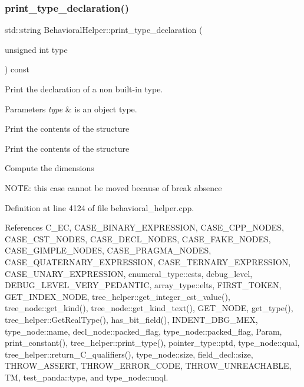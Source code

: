 \subsubsection{\texorpdfstring{print\+\_\+type\+\_\+declaration()}{print\_type\_declaration()}}
{\footnotesize\ttfamily std\+::string Behavioral\+Helper\+::print\+\_\+type\+\_\+declaration (\begin{DoxyParamCaption}\item[{unsigned int}]{type }\end{DoxyParamCaption}) const\hspace{0.3cm}{\ttfamily [virtual]}}



Print the declaration of a non built-\/in type. 


\begin{DoxyParams}{Parameters}
{\em type} & is an object type. \\
\hline
\end{DoxyParams}
Print the contents of the structure

Print the contents of the structure

Compute the dimensions

N\+O\+TE\+: this case cannot be moved because of break absence 

Definition at line 4124 of file behavioral\+\_\+helper.\+cpp.



References C\+\_\+\+EC, C\+A\+S\+E\+\_\+\+B\+I\+N\+A\+R\+Y\+\_\+\+E\+X\+P\+R\+E\+S\+S\+I\+ON, C\+A\+S\+E\+\_\+\+C\+P\+P\+\_\+\+N\+O\+D\+ES, C\+A\+S\+E\+\_\+\+C\+S\+T\+\_\+\+N\+O\+D\+ES, C\+A\+S\+E\+\_\+\+D\+E\+C\+L\+\_\+\+N\+O\+D\+ES, C\+A\+S\+E\+\_\+\+F\+A\+K\+E\+\_\+\+N\+O\+D\+ES, C\+A\+S\+E\+\_\+\+G\+I\+M\+P\+L\+E\+\_\+\+N\+O\+D\+ES, C\+A\+S\+E\+\_\+\+P\+R\+A\+G\+M\+A\+\_\+\+N\+O\+D\+ES, C\+A\+S\+E\+\_\+\+Q\+U\+A\+T\+E\+R\+N\+A\+R\+Y\+\_\+\+E\+X\+P\+R\+E\+S\+S\+I\+ON, C\+A\+S\+E\+\_\+\+T\+E\+R\+N\+A\+R\+Y\+\_\+\+E\+X\+P\+R\+E\+S\+S\+I\+ON, C\+A\+S\+E\+\_\+\+U\+N\+A\+R\+Y\+\_\+\+E\+X\+P\+R\+E\+S\+S\+I\+ON, enumeral\+\_\+type\+::csts, debug\+\_\+level, D\+E\+B\+U\+G\+\_\+\+L\+E\+V\+E\+L\+\_\+\+V\+E\+R\+Y\+\_\+\+P\+E\+D\+A\+N\+T\+IC, array\+\_\+type\+::elts, F\+I\+R\+S\+T\+\_\+\+T\+O\+K\+EN, G\+E\+T\+\_\+\+I\+N\+D\+E\+X\+\_\+\+N\+O\+DE, tree\+\_\+helper\+::get\+\_\+integer\+\_\+cst\+\_\+value(), tree\+\_\+node\+::get\+\_\+kind(), tree\+\_\+node\+::get\+\_\+kind\+\_\+text(), G\+E\+T\+\_\+\+N\+O\+DE, get\+\_\+type(), tree\+\_\+helper\+::\+Get\+Real\+Type(), has\+\_\+bit\+\_\+field(), I\+N\+D\+E\+N\+T\+\_\+\+D\+B\+G\+\_\+\+M\+EX, type\+\_\+node\+::name, decl\+\_\+node\+::packed\+\_\+flag, type\+\_\+node\+::packed\+\_\+flag, Param, print\+\_\+constant(), tree\+\_\+helper\+::print\+\_\+type(), pointer\+\_\+type\+::ptd, type\+\_\+node\+::qual, tree\+\_\+helper\+::return\+\_\+\+C\+\_\+qualifiers(), type\+\_\+node\+::size, field\+\_\+decl\+::size, T\+H\+R\+O\+W\+\_\+\+A\+S\+S\+E\+RT, T\+H\+R\+O\+W\+\_\+\+E\+R\+R\+O\+R\+\_\+\+C\+O\+DE, T\+H\+R\+O\+W\+\_\+\+U\+N\+R\+E\+A\+C\+H\+A\+B\+LE, TM, test\+\_\+panda\+::type, and type\+\_\+node\+::unql.



